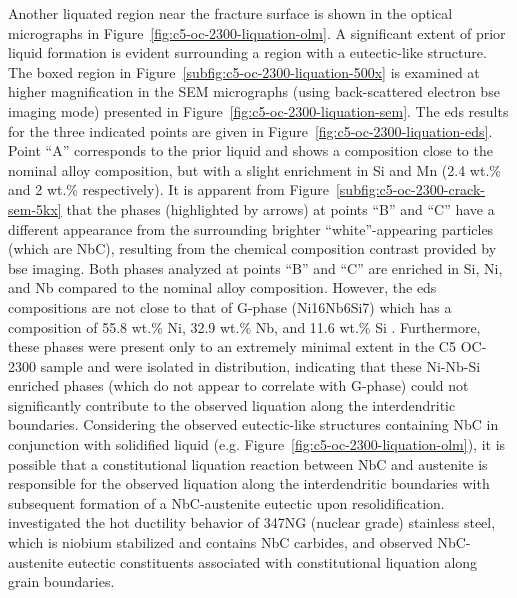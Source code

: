 {Another liquated region near the fracture surface is shown in the optical micrographs in Figure~\ref{fig:c5-oc-2300-liquation-olm}. A significant extent of prior liquid formation is evident surrounding a region with a eutectic-like structure. The boxed region in Figure~\ref{subfig:c5-oc-2300-liquation-500x} is examined at higher magnification in the SEM micrographs (using back-scattered electron \gls{bse} imaging mode) presented in Figure~\ref{fig:c5-oc-2300-liquation-sem}. The \gls{eds} results for the three indicated points are given in Figure~\ref{fig:c5-oc-2300-liquation-eds}. Point ``A'' corresponds to the prior liquid and shows a composition close to the nominal alloy composition, but with a slight enrichment in Si and Mn (2.4 wt.\% and 2 wt.\% respectively). It is apparent from Figure~\ref{subfig:c5-oc-2300-crack-sem-5kx} that the phases (highlighted by arrows) at points ``B'' and ``C'' have a different appearance from the surrounding brighter ``white''-appearing particles (which are NbC), resulting from the chemical composition contrast provided by \gls{bse} imaging. Both phases analyzed at points ``B'' and ``C'' are enriched in Si, Ni, and Nb compared to the nominal alloy composition. However, the \gls{eds} compositions are not close to that of G-phase (Ni16Nb6Si7) which has a composition of 55.8 wt.\% Ni, 32.9 wt.\% Nb, and 11.6 wt.\% Si \cite{hoffman_high_2000-1}. Furthermore, these phases were present only to an extremely minimal extent in the C5 OC-2300 sample and were isolated in distribution, indicating that these Ni-Nb-Si enriched phases (which do not appear to correlate with G-phase) could not significantly contribute to the observed liquation along the interdendritic boundaries. Considering the observed eutectic-like structures containing NbC in conjunction with solidified liquid (e.g. Figure~\ref{fig:c5-oc-2300-liquation-olm}), it is possible that a constitutional liquation reaction between NbC and austenite is responsible for the observed liquation along the interdendritic boundaries with subsequent formation of a NbC-austenite eutectic upon resolidification. \citet{lee_weldability_1988} investigated the hot ductility behavior of 347NG (nuclear grade) stainless steel, which is niobium stabilized and contains NbC carbides, and observed NbC-austenite eutectic constituents associated with constitutional liquation along grain boundaries.


}
